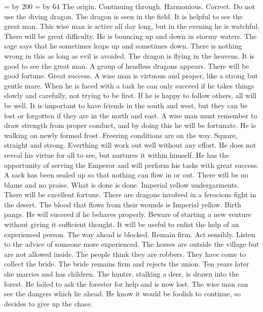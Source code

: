 \clchar=\changeline
\advance\clchar by 200
\hexachar=\hexagram
\advance\hexachar by 64
\ifcase \hexagram
\or {}
	{The origin. Continuing through. Harmonious. Correct.}
	{Do not use the diving dragon.}
	{The dragon is seen in the field. It is helpful to see the great man.}
	{This wise man is active all day long, but in the evening he is watchful.
		There will be great difficulty.}
	{He is bouncing up and down in stormy waters. The sage says that he sometimes leaps up and sometimes
   		down. There is nothing wrong in this as long as evil is avoided.}
	{The dragon is flying in the heavens. It is good to see the great man.}
	{A group of headless dragons appears. There will be good fortune.}
\or {}
	{Great success. A wise man is virtuous and proper, like a strong but gentle mare. When he is faced with a
		task he can only succeed if he takes things slowly and carefully, not trying to be first. If he is
		happy to follow others, all will be well. It is important to have friends in the south and west,
		but they can be lost or forgotten if they are in the north and east. A wise man must remember to
		draw strength from proper conduct, and by doing this he will be fortunate.}
	{He is walking on newly formed frost. Freezing conditions are on the way.}
	{Square, straight and strong. Everthing will work out well without any effort.}
	{He does not reveal his virtue for all to see, but nurtures it within himself. He has the opportunity
   		of serving the Emperor and will perform his tasks with great success.}
	{A sack has been sealed up so that nothing can flow in or
	out. There will be no blame and no praise. What is done is done.}
	{Imperial yellow undergarments. There will be excellent fortune.}
	{There are dragons involved in a ferocious fight in the desert. The blood that flows from their wounds
   		is Imperial yellow.}
\or {}
	{Birth pangs. He will succeed if he behaves properly. Beware of starting a new venture without giving
	it sufficient thought. It will be useful to enlist the help of an experienced person.}
	{The way ahead is blocked. Remain firm. Act sensibly. Listen to the advice of someone more experienced.}
	{The horses are outside the village but are not allowed inside. The people think they are robbers.
   		They have come to collect the bride. The bride remains firm and rejects the union. Ten years later
		she marries and has children.}
	{The hunter, stalking a deer, is drawn into the forest. He failed to ask the forester for help and is
   		now lost. The wise man can see the dangers which lie ahead. He know it would be foolish to
		continue, so decides to give up the chase.}
